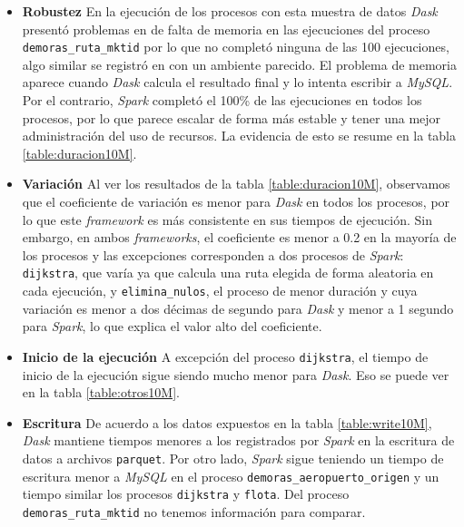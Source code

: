 \begin{itemize}

	\item \textbf{Robustez} En la ejecución de los procesos con esta muestra de datos \textit{Dask} presentó problemas en de falta de memoria en las ejecuciones del proceso \texttt{demoras\_ruta\_mktid} por lo que no completó ninguna de las 100 ejecuciones, algo similar se registró en \cite{comparative-evolution} con un ambiente parecido. El problema de memoria aparece cuando \textit{Dask} calcula el resultado final y lo intenta escribir a \textit{MySQL}. Por el contrario, \textit{Spark} completó el 100\% de las ejecuciones en todos los procesos, por lo que parece escalar de forma más estable y tener una mejor administración del uso de recursos. La evidencia de esto se resume en la tabla \ref{table:duracion10M}.
	
	\item \textbf{Variación} Al ver los resultados de la tabla \ref{table:duracion10M}, observamos que el coeficiente de variación es menor para \textit{Dask} en todos los procesos, por lo que este \textit{framework} es más consistente en sus tiempos de ejecución. Sin embargo, en ambos \textit{frameworks}, el coeficiente es menor a 0.2 en la mayoría de los procesos y las excepciones corresponden a dos procesos de \textit{Spark}: \texttt{dijkstra}, que varía ya que calcula una ruta elegida de forma aleatoria en cada ejecución, y \texttt{elimina\_nulos}, el proceso de menor duración y cuya variación es menor a dos décimas de segundo para \textit{Dask} y menor a 1 segundo para \textit{Spark}, lo que explica el valor alto del coeficiente.
	
	\item \textbf{Inicio de la ejecución} A excepción del proceso \texttt{dijkstra}, el tiempo de inicio de la ejecución sigue siendo mucho menor para \textit{Dask}. Eso se puede ver en la tabla \ref{table:otros10M}.
	
	\item \textbf{Escritura} De acuerdo a los datos expuestos en la tabla \ref{table:write10M}, \textit{Dask} mantiene tiempos menores a los registrados por \textit{Spark} en la escritura de datos a archivos \texttt{parquet}. Por otro lado, \textit{Spark} sigue teniendo un tiempo de escritura menor a \textit{MySQL} en el proceso \texttt{demoras\_aeropuerto\_origen} y un tiempo similar los procesos \texttt{dijkstra} y \texttt{flota}. Del proceso \texttt{demoras\_ruta\_mktid} no tenemos información para comparar. 
	

\end{itemize}
